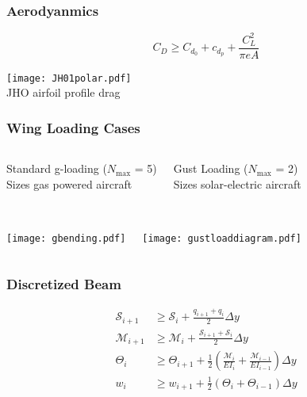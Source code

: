 \documentclass{beamer}
\begin{document}
\begin{frame}
    \frametitle{Aerodyanmics}

    \[ C_D \geq C_{d_0} + c_{d_p} + \frac{C_L^2}{\pi e A} \]

    \begin{center}
    \texttt{[image: JH01polar.pdf]} \\
    JHO airfoil profile drag
    \end{center}
    
\end{frame}

\begin{frame}
    \frametitle{Wing Loading Cases}
      
    \begin{columns}
        \begin{center}
        Standard g-loading ($N_{\text{max}}$ = 5) \\
        Sizes gas powered aircraft \\~\\
        \end{center}
        
        \begin{center}
        Gust Loading ($N_{\text{max}}$ = 2) \\
        Sizes solar-electric aircraft \\~\\
        \end{center}
    \end{columns}

    \begin{columns}
        \texttt{[image: gbending.pdf]}
        
        \texttt{[image: gustloaddiagram.pdf]}
    \end{columns}
\end{frame}

\begin{frame}
    \frametitle{Discretized Beam}

    \begin{align*}
        \mathcal{S}_{i+1} &\geq \mathcal{S}_i + \frac{q_{i+1} + q_i}{2} \Delta y \\
        \mathcal{M}_{i+1} &\geq \mathcal{M}_i + \frac{\mathcal{S}_{i+1} + \mathcal{S}_i}{2} \Delta y \\
        \Theta_{i} &\geq \Theta_{i+1} + \frac{1}{2} \left(\frac{\mathcal{M}_i}{EI_i} + \frac{\mathcal{M}_{i-1}}{EI_{i-1}} \right) \Delta y \\
        w_{i} &\geq w_{i+1} + \frac{1}{2} (\Theta_i + \Theta_{i-1}) \Delta y 
    \end{align*}
\end{frame}
\end{document}
